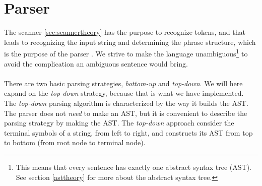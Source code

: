 \section{Parser}
\label{sec:parser}
The scanner \ref{sec:scannertheory} has the purpose to recognize tokens, and that leads to recognizing the input string and determining the phrase structure, which is the purpose of the parser \cite{misc:spo}. We strive to make the language unambiguous\footnote{This means that every sentence has exactly one abstract syntax tree (AST). See section \ref{asttheory} for more about the abstract syntax tree.} to avoid the complication an ambiguous sentence would bring.\\
\\
There are two basic parsing strategies, \textit{bottom-up} and \textit{top-down}. We will here expand on the \textit{top-down} strategy, because that is what we have implemented.\\ \indent
The \textit{top-down} parsing algorithm is characterized by the way it builds the AST. The parser does not \textit{need} to make an AST, but it is convenient to describe the parsing strategy by making the AST. The \textit{top-down} approach consider the terminal symbols of a string, from left to right, and constructs its AST from top to bottom (from root node to terminal node).